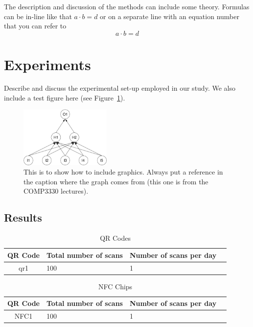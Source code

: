 \documentclass[a4,12pt]{article}
\begin{document}
%
The description and discussion of the methods can include some theory. Formulas can be in-line like that $a \cdot b = d$ or on a separate line with an equation number that you can refer to
\begin{equation}
a \cdot b = d
\end{equation}
%
\section{Experiments}
%
Describe and discuss the experimental set-up employed in our study. We also include a test figure here (see Figure~\ref{fig:nn1}). 
\begin{figure}[htbp]
\begin{center}
    \leavevmode
    \includegraphics[width=45mm]{figure.pdf}
\caption{This is to show how to include graphics. Always put a reference in the caption where the graph comes from (this one is from the COMP3330 lectures).}
\label{fig:nn1}
\end{center}
\end{figure}
%
\subsection{Results}
\begin{table}[h!]
    \begin{center}
        \leavevmode
        \begin{tabular}{|cll|l|}\hline
            QR Code & Total number of scans & Number of scans per day\\[0.1cm]\hline
            qr1 & 100 & 1\\\hline
        \end{tabular}
    \end{center}
    \caption{QR Codes}
    \label{table:qrcodes}
\end{table}

\begin{table}[h!]
    \begin{center}
    \leavevmode 
    \small
    \begin{tabular}{|cll|l|}\hline
        QR Code & Total number of scans & Number of scans per day\\[0.1cm]\hline
        NFC1 & 100 & 1\\\hline
    \end{tabular}
    \end{center}
    \caption{NFC Chips}
    \label{table:nfcchips}
\end{table}
\end{document}
